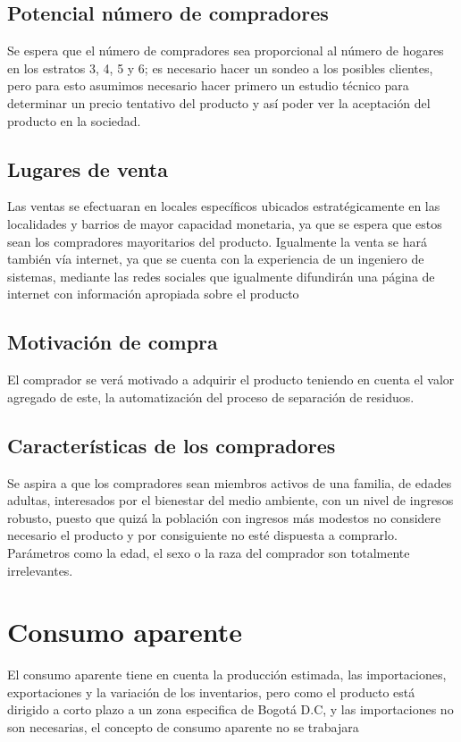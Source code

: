 \documentclass[letterpaper,12pt]{scrreprt}
\begin{document}
    \subsection{Potencial número de compradores}
    Se espera que el número de compradores sea proporcional al número de hogares en los estratos 3, 4, 5 y 6; es necesario hacer un sondeo a los posibles clientes, pero para esto asumimos necesario hacer primero un estudio técnico para determinar un precio tentativo del producto y así poder ver la aceptación del producto en la sociedad.

    \subsection{Lugares de venta}
    Las ventas se efectuaran en locales específicos ubicados estratégicamente en las localidades y barrios de mayor capacidad monetaria, ya que se espera que estos sean los compradores mayoritarios del producto. Igualmente la venta se hará también vía internet, ya que se cuenta con la experiencia de un ingeniero de sistemas, mediante las redes sociales que igualmente difundirán una página de internet con información apropiada sobre el producto

    \subsection{Motivación de compra}
    El comprador se verá motivado a adquirir el producto teniendo en cuenta el valor agregado de este, la automatización del proceso de separación de residuos.

    \subsection{Características de los compradores}
    Se aspira a que los compradores sean miembros activos de una familia, de edades adultas, interesados por el bienestar del medio ambiente, con un nivel de ingresos robusto, puesto que quizá la población con ingresos más modestos no considere necesario el producto y por consiguiente no esté dispuesta a comprarlo. Parámetros como la edad, el sexo o la raza del comprador son totalmente irrelevantes.

    \section{Consumo aparente}
    El consumo aparente tiene en cuenta la producción estimada, las importaciones, exportaciones y la variación de los inventarios, pero como el producto está dirigido a corto plazo a un zona especifica de Bogotá D.C, y las importaciones no son necesarias, el concepto de consumo aparente no se trabajara
\end{document}
